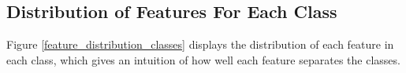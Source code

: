 \subsection{Distribution of Features For Each Class}
Figure \ref{feature_distribution_classes} displays the distribution of each feature in each class, which gives an intuition of how well each feature separates the classes.

